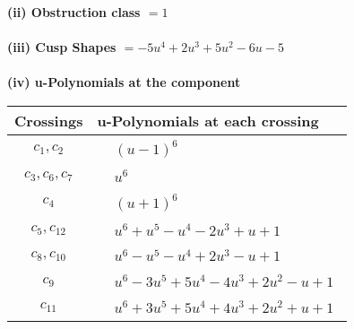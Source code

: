\documentclass[1p]{elsarticle_modified}
\theoremstyle{definition}
\begin{document}
\flushleft \textbf{(ii) Obstruction class $= 1$}\\~\\
\flushleft \textbf{(iii) Cusp Shapes $= -5 u^4+2 u^3+5 u^2-6 u-5$}\\~\\
\newpage\renewcommand{\arraystretch}{1}
\flushleft \textbf{(iv) u-Polynomials at the component}\newline \\
\begin{tabular}{m{50pt}|m{274pt}}
Crossings & \hspace{64pt}u-Polynomials at each crossing \\
\hline $$\begin{aligned}c_{1},c_{2}\end{aligned}$$&$\begin{aligned}
&(u-1)^6
\end{aligned}$\\
\hline $$\begin{aligned}c_{3},c_{6},c_{7}\end{aligned}$$&$\begin{aligned}
&u^6
\end{aligned}$\\
\hline $$\begin{aligned}c_{4}\end{aligned}$$&$\begin{aligned}
&(u+1)^6
\end{aligned}$\\
\hline $$\begin{aligned}c_{5},c_{12}\end{aligned}$$&$\begin{aligned}
&u^6+u^5- u^4-2 u^3+u+1
\end{aligned}$\\
\hline $$\begin{aligned}c_{8},c_{10}\end{aligned}$$&$\begin{aligned}
&u^6- u^5- u^4+2 u^3- u+1
\end{aligned}$\\
\hline $$\begin{aligned}c_{9}\end{aligned}$$&$\begin{aligned}
&u^6-3 u^5+5 u^4-4 u^3+2 u^2- u+1
\end{aligned}$\\
\hline $$\begin{aligned}c_{11}\end{aligned}$$&$\begin{aligned}
&u^6+3 u^5+5 u^4+4 u^3+2 u^2+u+1
\end{aligned}$\\
\hline
\end{tabular}\\~\\
\end{document}
